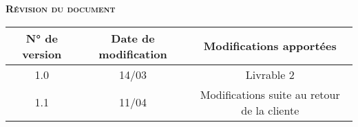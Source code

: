 \begin{center}
\textsc{\Large \textbf{Révision du document}}
\end{center}
\vspace{2cm}

\begin{tabular}{|c|c|c|}
    \hline
  N° de version & Date de modification & Modifications apportées  \\
    \hline
    1.0 & 14/03 & Livrable 2 \\ \hline
    1.1 & 11/04 & Modifications suite au retour de la cliente\\ 
    \hline
\end{tabular}
